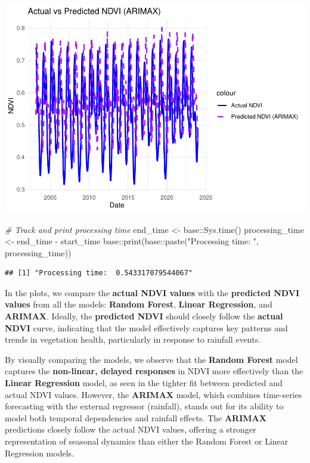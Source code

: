 \documentclass[
]{article}
\newenvironment{Shaded}{}{}
\newcommand{\CommentTok}[1]{\textcolor[rgb]{0.38,0.63,0.69}{\textit{#1}}}
\newcommand{\FunctionTok}[1]{\textcolor[rgb]{0.02,0.16,0.49}{#1}}
\newcommand{\NormalTok}[1]{#1}
\newcommand{\OtherTok}[1]{\textcolor[rgb]{0.00,0.44,0.13}{#1}}
\newcommand{\SpecialCharTok}[1]{\textcolor[rgb]{0.25,0.44,0.63}{#1}}
\newcommand{\StringTok}[1]{\textcolor[rgb]{0.25,0.44,0.63}{#1}}
\begin{document}
\begin{center}\includegraphics{BI_VegetationResponse_Project_HarvardX_Ph125_9x_files/figure-latex/vis_predictions-3} \end{center}

\begin{Shaded}
\begin{Highlighting}[]
\CommentTok{\# Track and print processing time}
\NormalTok{end\_time }\OtherTok{\textless{}{-}}\NormalTok{ base}\SpecialCharTok{::}\FunctionTok{Sys.time}\NormalTok{()}
\NormalTok{processing\_time }\OtherTok{\textless{}{-}}\NormalTok{ end\_time }\SpecialCharTok{{-}}\NormalTok{ start\_time}
\NormalTok{base}\SpecialCharTok{::}\FunctionTok{print}\NormalTok{(base}\SpecialCharTok{::}\FunctionTok{paste}\NormalTok{(}\StringTok{"Processing time: "}\NormalTok{, processing\_time))}
\end{Highlighting}
\end{Shaded}

\begin{verbatim}
## [1] "Processing time:  0.543317079544067"
\end{verbatim}

In the plots, we compare the \textbf{actual NDVI values} with the
\textbf{predicted NDVI values} from all the models: \textbf{Random
Forest}, \textbf{Linear Regression}, and \textbf{ARIMAX}. Ideally, the
\textbf{predicted NDVI} should closely follow the \textbf{actual NDVI}
curve, indicating that the model effectively captures key patterns and
trends in vegetation health, particularly in response to rainfall
events.

By visually comparing the models, we observe that the \textbf{Random
Forest} model captures the \textbf{non-linear, delayed responses} in
NDVI more effectively than the \textbf{Linear Regression} model, as seen
in the tighter fit between predicted and actual NDVI values. However,
the \textbf{ARIMAX} model, which combines time-series forecasting with
the external regressor (rainfall), stands out for its ability to model
both temporal dependencies and rainfall effects. The \textbf{ARIMAX}
predictions closely follow the actual NDVI values, offering a stronger
representation of seasonal dynamics than either the Random Forest or
Linear Regression models.
\end{document}
